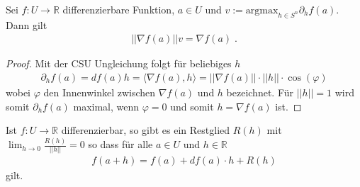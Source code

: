 \begin{Satz}
Sei   $f: U \to \mathbb{R}$ differenzierbare Funktion,  $a \in U$ und $v := \text{argmax}_{ h \in S^n} \partial_h f(a) $.
Dann gilt 
\begin{align*}
|| \nabla f(a) || v =  \nabla f(a) \; .
\end{align*} 
\end{Satz}
\begin{proof}
Mit der CSU Ungleichung folgt für beliebiges $h$ 
\begin{align*}
\partial_h f(a) = df(a) h = \langle \nabla f(a) , h \rangle = || \nabla f(a)||  \cdot ||h|| \cdot \cos(\varphi) 
\end{align*} 
wobei $\varphi$ den Innenwinkel zwischen $\nabla f(a)$ und $h$ bezeichnet. Für $||h|| = 1$ wird somit $\partial_h f(a) $ maximal, wenn $\varphi = 0$ und somit $h =  \nabla f(a)$ ist.
\end{proof}







\begin{Satz}
\label{lokaleLinearisierung}
Ist  $f: U \to \mathbb{R}$ differenzierbar, so gibt es ein Restglied $R(h)$ mit  $\lim_{h \to 0} \frac{R(h)}{ ||h||} = 0$  so dass für alle $a \in U$ und $h \in \mathbb{R}$ 
\begin{align*}
f(a + h)  =  f(a)  +  df(a) \cdot h + R(h) 
\end{align*}
gilt. 
\end{Satz}




